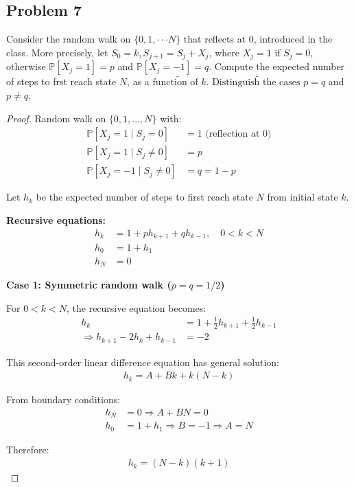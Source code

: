 \documentclass[letterpaper, 11pt]{article}
\newcommand{\1}{\mathds{1}}	%
\theoremstyle{definition}
\begin{document}
\subsection*{Problem 7}
Consider the random walk on $\{0,1,\cdotp\cdotp\cdotp N\}$ that reflects at 0, introduced in the class. More precisely, let $S_0=k,S_{j+1}=S_j+X_j$, where $X_j=1$ if $S_j=0$, otherwise $\mathbb{P}[X_j=1]=p$ and $\mathbb{P}[X_j=-1]=q.$ Compute the expected number of steps to frst reach state $N$, as a $\tilde{\text{function of }k}.\tilde{\text{ Distinguish the cases }p}=q$ and $p\neq q.$
\begin{proof}
    Random walk on $\{0,1,\ldots,N\}$ with:
\begin{align*}
\mathbb{P}[X_j = 1 \mid S_j = 0] &= 1 \text{ (reflection at 0)}\\
\mathbb{P}[X_j = 1 \mid S_j \neq 0] &= p\\
\mathbb{P}[X_j = -1 \mid S_j \neq 0] &= q = 1-p
\end{align*}

Let $h_k$ be the expected number of steps to first reach state $N$ from initial state $k$.

\textbf{Recursive equations:}
\begin{align*}
h_k &= 1 + ph_{k+1} + qh_{k-1}, \quad 0 < k < N\\
h_0 &= 1 + h_1\\
h_N &= 0
\end{align*}

\textbf{Case 1: Symmetric random walk ($p = q = 1/2$)}

For $0 < k < N$, the recursive equation becomes:
\begin{align*}
h_k &= 1 + \frac{1}{2}h_{k+1} + \frac{1}{2}h_{k-1}\\
\Rightarrow h_{k+1} - 2h_k + h_{k-1} &= -2
\end{align*}

This second-order linear difference equation has general solution:
\begin{align*}
h_k = A + Bk + k(N-k)
\end{align*}

From boundary conditions:
\begin{align*}
h_N &= 0 \Rightarrow A + BN = 0\\
h_0 &= 1 + h_1 \Rightarrow B = -1 \Rightarrow A = N
\end{align*}

Therefore:
\begin{align*}
h_k = (N-k)(k+1)
\end{align*}


\end{proof}
\end{document}
